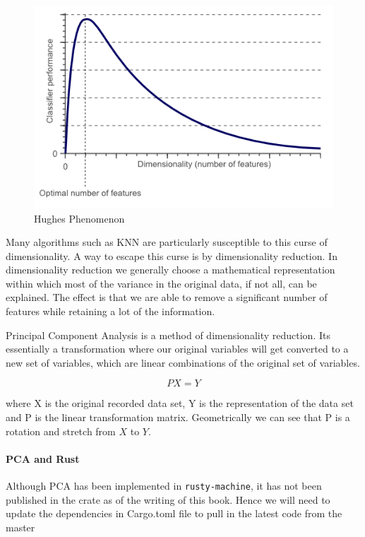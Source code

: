 \documentclass{book}
\begin{document}
\begin{figure}[htpb]
	\centering
	\includegraphics[width=0.8\linewidth]{HughesPhenomenon.png}
	\caption{Hughes Phenomenon}
	\label{fig:Hughes_Phenomenon}
\end{figure}

Many algorithms such as KNN are particularly susceptible to this curse of dimensionality. A way to escape this curse is by dimensionality reduction. In dimensionality reduction we generally choose a mathematical representation within which most of the variance in the original data, if not all, can be explained. The effect is that we are able to remove a significant number of features while retaining a lot of the information.

Principal Component Analysis is a method of dimensionality reduction. Its essentially a transformation where our original variables will get converted to a new set of variables, which are linear combinations of the original set of variables.

\begin{equation}
	PX = Y
\end{equation}

where X is the original recorded data set, Y is the representation of the data set and P is the linear transformation matrix. Geometrically we can see that P is a rotation and stretch from $X$ to $Y$. 
\label{par:singular_value_decomposition}

\paragraph{PCA and Rust}%
Although PCA has been implemented in \lstinline{rusty-machine}, it has not been published in the crate as of the writing of this book. Hence we will need to update the dependencies in Cargo.toml file to pull in the latest code from the master
\end{document}
